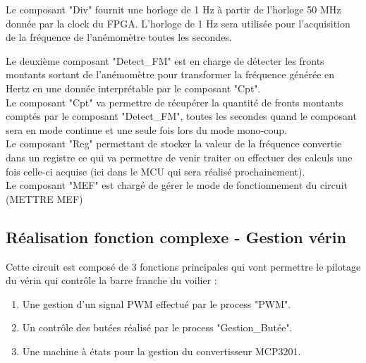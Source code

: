   Le composant "Div" fournit une horloge de 1 Hz à partir de l'horloge 50 MHz donnée par la clock du FPGA. L'horloge de 1 Hz sera utilisée pour l'acquisition de la fréquence de l'anémomètre toutes les secondes.

\newpage

  Le deuxième composant "Detect\_FM" est en charge de détecter les fronts montants sortant de l'anémomètre pour transformer la fréquence générée en Hertz en une donnée interprétable par le composant "Cpt".\\\newline
  Le composant "Cpt" va permettre de récupérer la quantité de fronts montants comptés par le composant "Detect\_FM", toutes les secondes quand le composant sera en mode continue et une seule fois lors du mode mono-coup.\\\newline
  Le composant "Reg" permettant de stocker la valeur de la fréquence convertie dans un registre ce qui va permettre de venir traiter ou effectuer des calculs une fois celle-ci acquise (ici dans le MCU qui sera réalisé prochainement).\\\newline
  Le composant "MEF" est chargé de gérer le mode de fonctionnement du circuit (METTRE MEF)


  \newpage

  \subsection{Réalisation fonction complexe - Gestion vérin}

  Cette circuit est composé de 3 fonctions principales qui vont permettre le pilotage du vérin qui contrôle la barre franche du voilier :
\begin{enumerate}
    \item Une gestion d'un signal PWM effectué par le process "PWM". 
    \item Un contrôle des butées réalisé par le process "Gestion\_Butée".
    \item Une machine à états pour la gestion du convertisseur MCP3201.
\end{enumerate} 

